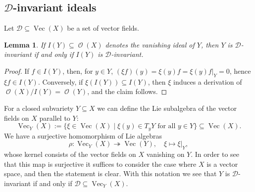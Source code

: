 \documentclass{amsart}
\newtheorem{lem}[thm]{Lemma}
\theoremstyle{definition}
\theoremstyle{remark}
\begin{document}
{\par\smallskip}
\subsection{${\mathcal D}$-invariant ideals}
Let ${\mathcal D} {\subseteq} \operatorname{Vec}(X)$ be a set of vector fields.
\begin{lem}
If $I(Y) {\subseteq} \operatorname{\mathcal O}(X)$ denotes the vanishing ideal of $Y$, then $Y$ is ${\mathcal D}$-invariant if and only if $I(Y)$ is ${\mathcal D}$-invariant.
\end{lem}
\begin{proof}
If $f \in I(Y)$, then, for $y \in Y$,  $(\xi f)(y) = \xi(y) f = \xi(y) f|_{Y}= 0$, hence $\xi f \in I(Y)$. Conversely, if $\xi(I(Y)) {\subseteq} I(Y)$, then $\xi$ induces a derivation of $\operatorname{\mathcal O}(X)/I(Y) = \operatorname{\mathcal O}(Y)$, and the claim follows.
\end{proof}

For a closed subvariety $Y {\subseteq} X$ we can define the  Lie subalgebra of the vector fields on $X$ parallel to $Y$:
$$
\operatorname{Vec}_{Y}(X):=\{\xi \in \operatorname{Vec}(X) \mid \xi(y) \in T_{y}Y \text{ for all }y \in Y\} {\subseteq} \operatorname{Vec}(X).
$$ 
We have a surjective homomorphism of Lie algebras 
$$
\rho\colon \operatorname{Vec}_{Y}(X) {\twoheadrightarrow} \operatorname{Vec}(Y), \quad\xi\mapsto \xi|_{Y},
$$  
whose kernel consists of the vector fields on $X$ vanishing on $Y$. In order to see that this map is surjective it suffices to consider the case where $X$ is a vector space, and then the statement is clear. With this notation we see that  $Y$ is ${\mathcal D}$-invariant if and only if  ${\mathcal D} {\subseteq} \operatorname{Vec}_{Y}(X)$.
\end{document}
